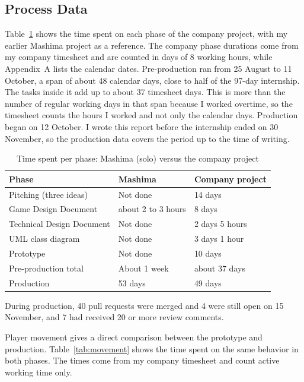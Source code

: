 \subsection{Process Data}
Table~\ref{tab:timeline} shows the time spent on each phase of the company project, with my earlier Mashima project as a reference. The company phase durations come from my company timesheet and are counted in days of 8 working hours, while Appendix~A lists the calendar dates. Pre-production ran from 25 August to 11 October, a span of about 48 calendar days, close to half of the 97-day internship. The tasks inside it add up to about 37 timesheet days. This is more than the number of regular working days in that span because I worked overtime, so the timesheet counts the hours I worked and not only the calendar days. Production began on 12 October. I wrote this report before the internship ended on 30 November, so the production data covers the period up to the time of writing.
\begin{table}[htbp]
    \centering
    \caption{Time spent per phase: Mashima (solo) versus the company project}
    \label{tab:timeline}
    \begin{tabular}{p{4.2cm}p{4.9cm}p{4.9cm}}
        \toprule
        \textbf{Phase} & \textbf{Mashima} & \textbf{Company project} \\
        \midrule
        Pitching (three ideas) & Not done & 14 days \\
        Game Design Document & about 2 to 3 hours & 8 days \\
        Technical Design Document & Not done & 2 days 5 hours \\
        UML class diagram & Not done & 3 days 1 hour \\
        Prototype & Not done & 10 days \\
        \midrule
        Pre-production total & About 1 week & about 37 days \\
        Production & 53 days & 49 days \\
        \bottomrule
    \end{tabular}
\end{table}

\bigskip
During production, 40 pull requests were merged and 4 were still open on 15 November, and 7 had received 20 or more review comments.

\pagebreak
Player movement gives a direct comparison between the prototype and production. 
Table~\ref{tab:movement} shows the time spent on the same behavior in both phases. The times come from my company timesheet and count active working time only.

